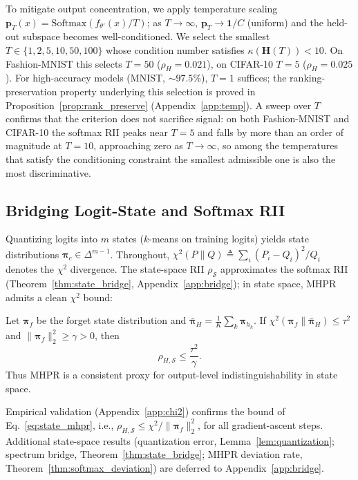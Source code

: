 \documentclass[smallextended]{svjour3}       %
\newcommand{\coloneqq}{\triangleq}
\begin{document}
To mitigate output concentration, we apply temperature scaling $\mathbf{p}_T(x) = \mathrm{Softmax}(f_{\theta'}(x)/T)$; as $T\to\infty$, $\mathbf{p}_T \to \mathbf{1}/C$ (uniform) and the held-out subspace becomes well-conditioned. We select the smallest $T\in\{1,2,5,10,50,100\}$ whose condition number satisfies $\kappa(\mathbf{H}(T)) < 10$. On Fashion-MNIST this selects $T=50$ ($\rho_H = 0.021$), on CIFAR-10 $T=5$ ($\rho_H = 0.025$). For high-accuracy models (MNIST, $\sim97.5\%$), $T=1$ suffices; the ranking-preservation property underlying this selection is proved in Proposition~\ref{prop:rank_preserve} (Appendix~\ref{app:temp}). A sweep over $T$ confirms that the criterion does not sacrifice signal: on both Fashion-MNIST and CIFAR-10 the softmax RII peaks near $T{=}5$ and falls by more than an order of magnitude at $T{=}10$, approaching zero as $T\to\infty$, so among the temperatures that satisfy the conditioning constraint the smallest admissible one is also the most discriminative.

\subsection{Bridging Logit-State and Softmax RII}
\label{sec:logit_bridge}

Quantizing logits into $m$ states ($k$-means on training logits) yields state distributions $\boldsymbol{\pi}_c\in\Delta^{m-1}$. Throughout, $\chi^2(P\|Q)\coloneqq\sum_i (P_i-Q_i)^2/Q_i$ denotes the $\chi^2$ divergence. The state-space RII $\rho_{\mathcal{S}}$ approximates the softmax RII (Theorem~\ref{thm:state_bridge}, Appendix~\ref{app:bridge}); in state space, MHPR admits a clean $\chi^2$ bound:

\begin{theorem}
\label{thm:state_mhpr}
Let $\boldsymbol{\pi}_f$ be the forget state distribution and $\bar{\boldsymbol{\pi}}_H = \frac{1}{K}\sum_k \boldsymbol{\pi}_{h_k}$. If $\chi^2(\boldsymbol{\pi}_f \| \bar{\boldsymbol{\pi}}_H) \le \tau^2$ and $\|\boldsymbol{\pi}_f\|_2^2 \ge \gamma > 0$, then
\begin{equation}
\rho_{H,\mathcal{S}} \le \frac{\tau^2}{\gamma}.
\label{eq:state_mhpr}
\end{equation}
Thus MHPR is a consistent proxy for output-level indistinguishability in state space.
\end{theorem}

Empirical validation (Appendix~\ref{app:chi2}) confirms the bound of Eq.~\eqref{eq:state_mhpr}, i.e., $\rho_{H,\mathcal{S}} \le \chi^2/\|\boldsymbol{\pi}_f\|_2^2$, for all gradient-ascent steps. Additional state-space results (quantization error, Lemma~\ref{lem:quantization}; spectrum bridge, Theorem~\ref{thm:state_bridge}; MHPR deviation rate, Theorem~\ref{thm:softmax_deviation}) are deferred to Appendix~\ref{app:bridge}.
\end{document}
